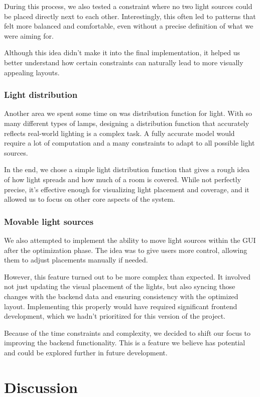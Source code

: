 \documentclass{article}
\begin{document}
During this process, we also tested a constraint where no two light sources could be placed directly next to each other. Interestingly, this often led to patterns that felt more balanced and comfortable, even without a precise definition of what we were aiming for.

Although this idea didn’t make it into the final implementation, it helped us better understand how certain constraints can naturally lead to more visually appealing layouts.

\subsubsection{Light distribution}
Another area we spent some time on was distribution function for light. With so many different types of lamps, designing a distribution function that accurately reflects real-world lighting is a complex task. A fully accurate model would require a lot of computation and a many constraints to adapt to all possible light sources.

In the end, we chose a simple light distribution function that gives a rough idea of how light spreads and how much of a room is covered. While not perfectly precise, it’s effective enough for visualizing light placement and coverage, and it allowed us to focus on other core aspects of the system.

\subsubsection{Movable light sources}
We also attempted to implement the ability to move light sources within the GUI after the optimization phase. The idea was to give users more control, allowing them to adjust placements manually if needed.

However, this feature turned out to be more complex than expected. It involved not just updating the visual placement of the lights, but also syncing those changes with the backend data and ensuring consistency with the optimized layout. Implementing this properly would have required significant frontend development, which we hadn’t prioritized for this version of the project.

Because of the time constraints and complexity, we decided to shift our focus to improving the backend functionality. This is a feature we believe has potential and could be explored further in future development.



\section{Discussion}
\end{document}
